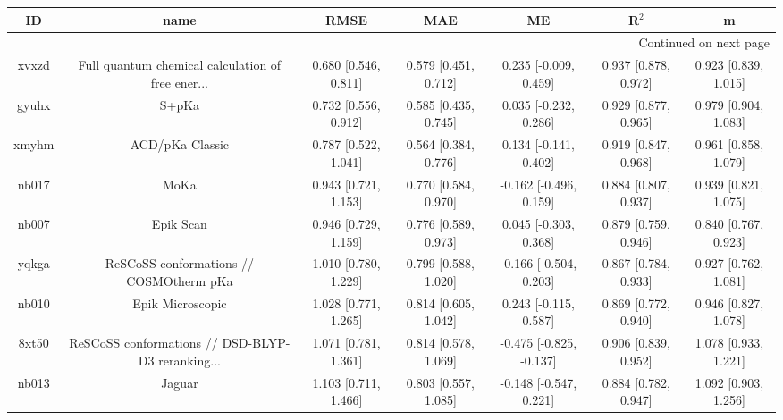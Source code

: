 \documentclass{article}
\begin{document}
\begin{center}
\begin{longtable}{|ccccccc|}
\toprule
    ID &                                               name &                  RMSE &                   MAE &                       ME &                 R$^2$ &                      m \\
\midrule
\endhead
\midrule
\multicolumn{7}{r}{{Continued on next page}} \\
\midrule
\endfoot

\bottomrule
\endlastfoot
 xvxzd &  Full quantum chemical calculation of free ener... &  0.680 [0.546, 0.811] &  0.579 [0.451, 0.712] &    0.235 [-0.009, 0.459] &  0.937 [0.878, 0.972] &   0.923 [0.839, 1.015] \\
 gyuhx &                                              S+pKa &  0.732 [0.556, 0.912] &  0.585 [0.435, 0.745] &    0.035 [-0.232, 0.286] &  0.929 [0.877, 0.965] &   0.979 [0.904, 1.083] \\
 xmyhm &                                    ACD/pKa Classic &  0.787 [0.522, 1.041] &  0.564 [0.384, 0.776] &    0.134 [-0.141, 0.402] &  0.919 [0.847, 0.968] &   0.961 [0.858, 1.079] \\
 nb017 &                                               MoKa &  0.943 [0.721, 1.153] &  0.770 [0.584, 0.970] &   -0.162 [-0.496, 0.159] &  0.884 [0.807, 0.937] &   0.939 [0.821, 1.075] \\
 nb007 &                                          Epik Scan &  0.946 [0.729, 1.159] &  0.776 [0.589, 0.973] &    0.045 [-0.303, 0.368] &  0.879 [0.759, 0.946] &   0.840 [0.767, 0.923] \\
 yqkga &            ReSCoSS conformations // COSMOtherm pKa &  1.010 [0.780, 1.229] &  0.799 [0.588, 1.020] &   -0.166 [-0.504, 0.203] &  0.867 [0.784, 0.933] &   0.927 [0.762, 1.081] \\
 nb010 &                                   Epik Microscopic &  1.028 [0.771, 1.265] &  0.814 [0.605, 1.042] &    0.243 [-0.115, 0.587] &  0.869 [0.772, 0.940] &   0.946 [0.827, 1.078] \\
 8xt50 &  ReSCoSS conformations // DSD-BLYP-D3 reranking... &  1.071 [0.781, 1.361] &  0.814 [0.578, 1.069] &  -0.475 [-0.825, -0.137] &  0.906 [0.839, 0.952] &   1.078 [0.933, 1.221] \\
 nb013 &                                             Jaguar &  1.103 [0.711, 1.466] &  0.803 [0.557, 1.085] &   -0.148 [-0.547, 0.221] &  0.884 [0.782, 0.947] &   1.092 [0.903, 1.256] \\

\end{longtable}
\end{center}
\end{document}
